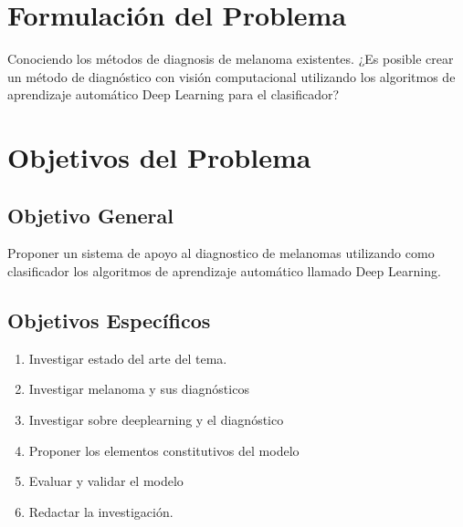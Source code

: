 \documentclass[a4paper]{article}
\begin{document}
\section{Formulación del Problema}
Conociendo los métodos de diagnosis de melanoma existentes. ¿Es posible crear un método de diagnóstico con visión computacional utilizando los algoritmos de aprendizaje automático Deep Learning para el clasificador?
\section{Objetivos del Problema}
\subsection{Objetivo General}

Proponer un sistema de apoyo al diagnostico de melanomas utilizando como clasificador los algoritmos de aprendizaje automático llamado Deep Learning.
\subsection{Objetivos Específicos}
\begin{enumerate}
\item Investigar estado del arte del tema.
\item Investigar melanoma y sus diagnósticos
\item Investigar sobre deeplearning y el diagnóstico
\item Proponer los elementos constitutivos del modelo
\item Evaluar y validar el modelo
\item Redactar la investigación.

\end{enumerate}



\end{document}
